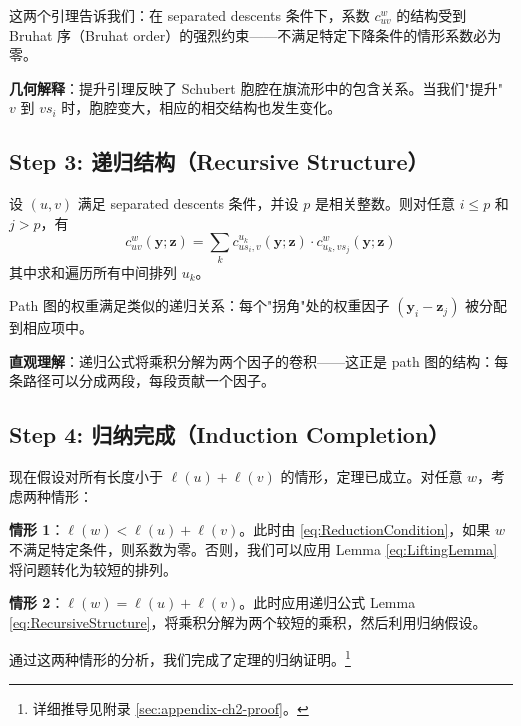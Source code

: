 这两个引理告诉我们：在 separated descents 条件下，系数 $c_{uv}^w$ 的结构受到 Bruhat 序（Bruhat order）的强烈约束——不满足特定下降条件的情形系数必为零。

\textbf{几何解释}：提升引理反映了 Schubert 胞腔在旗流形中的包含关系。当我们"提升" $v$ 到 $vs_i$ 时，胞腔变大，相应的相交结构也发生变化。

\subsection{Step 3: 递归结构（Recursive Structure）}
\label{sec:ProofStep3}

\begin{Lemma}
\label{eq:RecursiveStructure}
设 $(u, v)$ 满足 separated descents 条件，并设 $p$ 是相关整数。则对任意 $i \leq p$ 和 $j > p$，有
\begin{equation}
c_{uv}^w(\mathbf{y}; \mathbf{z}) = \sum_{k} c_{us_i, v}^{u_k}(\mathbf{y}; \mathbf{z}) \cdot c_{u_k, vs_j}^{w}(\mathbf{y}; \mathbf{z})
\label{eq:RecursiveFormula}
\end{equation}
其中求和遍历所有中间排列 $u_k$。
\end{Lemma}

\begin{Lemma}
\label{eq:WeightRecursive}
Path 图的权重满足类似的递归关系：每个"拐角"处的权重因子 $(\mathbf{y}_i - \mathbf{z}_j)$ 被分配到相应项中。
\end{Lemma}

\textbf{直观理解}：递归公式将乘积分解为两个因子的卷积——这正是 path 图的结构：每条路径可以分成两段，每段贡献一个因子。

\subsection{Step 4: 归纳完成（Induction Completion）}
\label{sec:ProofStep4}

现在假设对所有长度小于 $\ell(u) + \ell(v)$ 的情形，定理已成立。对任意 $w$，考虑两种情形：

\textbf{情形 1}：$\ell(w) < \ell(u) + \ell(v)$。此时由 \cref{eq:ReductionCondition}，如果 $w$ 不满足特定条件，则系数为零。否则，我们可以应用 Lemma \cref{eq:LiftingLemma} 将问题转化为较短的排列。

\textbf{情形 2}：$\ell(w) = \ell(u) + \ell(v)$。此时应用递归公式 Lemma \cref{eq:RecursiveStructure}，将乘积分解为两个较短的乘积，然后利用归纳假设。

通过这两种情形的分析，我们完成了定理的归纳证明。\footnote{详细推导见附录 \cref{sec:appendix-ch2-proof}。}

